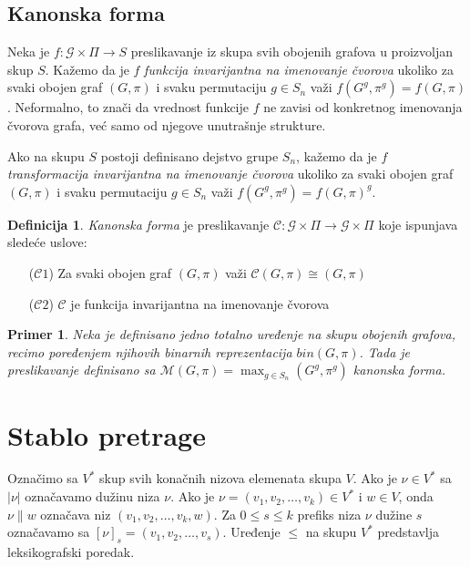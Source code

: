 \documentclass[12pt,oneside]{memoir}
\newtheorem{example}{Primer}
\theoremstyle{definition}
\newtheorem*{definition}{Definicija}
\begin{document}
   \subsection{Kanonska forma}

   Neka je $f : \mathcal{G} \times \Pi \to S$ preslikavanje iz skupa svih
   obojenih grafova u proizvoljan skup $S$.  Kažemo da je $f$ \emph{funkcija
   invarijantna na imenovanje čvorova} ukoliko za svaki obojen graf $(G, \pi)$
   i svaku permutaciju $g \in S_n$ važi $f(G^g, \pi^g) = f(G, \pi)$.
   Neformalno, to znači da vrednost funkcije $f$ ne zavisi od konkretnog
   imenovanja čvorova grafa, već samo od njegove unutrašnje strukture.

   Ako na skupu $S$ postoji definisano dejstvo grupe $S_n$, kažemo da je $f$
   \emph{transformacija invarijantna na imenovanje čvorova} ukoliko za svaki
   obojen graf $(G, \pi)$ i svaku permutaciju $g \in S_n$ važi $f(G^g, \pi^g) =
   f(G, \pi)^g$.


   \begin{definition}
	   \emph{Kanonska forma} je preslikavanje $\mathcal{C} : \mathcal{G} \times \Pi \to
	   \mathcal{G} \times \Pi$ koje ispunjava sledeće uslove:
	   \begin{itemize}
		   \item[($\mathcal{C}1$)] Za svaki obojen graf $(G, \pi)$ važi
			   $\mathcal{C}(G, \pi) \cong (G,
			\pi)$
		\item[($\mathcal{C}2$)] $\mathcal{C}$ je funkcija invarijantna na
			imenovanje čvorova
	   \end{itemize}
   \end{definition}

   \begin{example}
	   Neka je definisano jedno totalno uređenje na skupu obojenih grafova,
	   recimo poređenjem njihovih binarnih reprezentacija $bin(G, \pi)$. Tada
	   je preslikavanje definisano sa $\mathcal{M}(G, \pi) = \max_{g \in S_n}
	   (G^g, \pi^g)$ kanonska forma.
   \end{example}


 \section{Stablo pretrage}

  Označimo sa $V^*$ skup svih konačnih nizova elemenata skupa $V$. Ako je $\nu
  \in V^*$ sa $|\nu|$ označavamo dužinu niza $\nu$. Ako je $\nu = (v_1, v_2,
  \dots, v_k) \in V^*$ i $w \in V$, onda $\nu \| w$ označava niz $(v_1, v_2,
  \dots, v_k, w)$. Za $0 \leq s \leq k$ prefiks niza $\nu$ dužine $s$ označavamo
  sa $[\nu]_s = (v_1, v_2, \dots, v_s)$. Uređenje $\leq$ na skupu $V^*$
  predstavlja leksikografski poredak.
\end{document}
